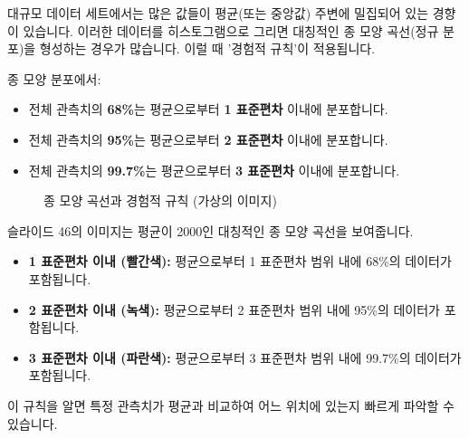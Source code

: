 \documentclass[11pt,a4paper]{article}
\theoremstyle{definition}
\begin{document}
대규모 데이터 세트에서는 많은 값들이 평균(또는 중앙값) 주변에 밀집되어 있는 경향이 있습니다. 이러한 데이터를 히스토그램으로 그리면 대칭적인 종 모양 곡선(정규 분포)을 형성하는 경우가 많습니다. 이럴 때 '경험적 규칙'이 적용됩니다.

\begin{infobox}[title=경험적 규칙의 내용]
종 모양 분포에서:
\begin{itemize}
    \item 전체 관측치의 \textbf{68\%}는 평균으로부터 \textbf{1 표준편차} 이내에 분포합니다.
    \item 전체 관측치의 \textbf{95\%}는 평균으로부터 \textbf{2 표준편차} 이내에 분포합니다.
    \item 전체 관측치의 \textbf{99.7\%}는 평균으로부터 \textbf{3 표준편차} 이내에 분포합니다.
\end{itemize}
\end{infobox}

\begin{figure}[h!]
    \centering
    \caption{종 모양 곡선과 경험적 규칙 (가상의 이미지)}
    \label{fig:empirical_rule}
\end{figure}
\begin{infobox}[title=가상의 이미지 설명: 종 모양 곡선과 경험적 규칙]
슬라이드 46의 이미지는 평균이 2000인 대칭적인 종 모양 곡선을 보여줍니다.
\begin{itemize}
    \item \textbf{1 표준편차 이내 (빨간색):} 평균으로부터 1 표준편차 범위 내에 68\%의 데이터가 포함됩니다.
    \item \textbf{2 표준편차 이내 (녹색):} 평균으로부터 2 표준편차 범위 내에 95\%의 데이터가 포함됩니다.
    \item \textbf{3 표준편차 이내 (파란색):} 평균으로부터 3 표준편차 범위 내에 99.7\%의 데이터가 포함됩니다.
\end{itemize}
이 규칙을 알면 특정 관측치가 평균과 비교하여 어느 위치에 있는지 빠르게 파악할 수 있습니다.
\end{infobox}
\end{document}
